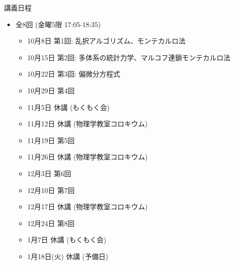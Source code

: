 \begin{frame}[t]{講義日程}
  \begin{itemize}
  \item 全8回 (金曜5限 {\color{red}17:05}-18:35)
    \begin{itemize}
    \item {\color{gray} 10月8日 第1回: 乱択アルゴリズム、モンテカルロ法}
    \item {\color{gray} 10月15日 第2回: 多体系の統計力学、マルコフ連鎖モンテカルロ法}
    \item 10月22日 第3回: 偏微分方程式
    \item 10月29日 第4回
    \item 11月5日 休講 (もくもく会)
    \item 11月12日 休講 (物理学教室コロキウム)
    \item 11月19日 第5回
    \item 11月26日 休講 (物理学教室コロキウム)
    \item 12月3日 第6回
    \item 12月10日 第7回
    \item 12月17日 休講 (物理学教室コロキウム)
    \item 12月24日 第8回
    \item 1月7日 休講 (もくもく会)
    \item 1月18日(火) 休講 (予備日)
    \end{itemize}
  \end{itemize}
\end{frame}
